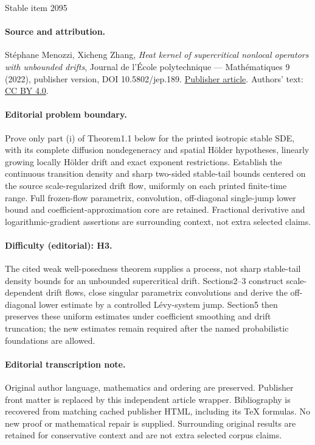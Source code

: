 \documentclass[11pt]{article}
\numberwithin{equation}{section}\providecommand{\asymp}{\mathrel{\sim}}
\theoremstyle{plain}
\theoremstyle{definition}
\newcommand\1{{\mathbf{1}}}
\begin{document}
\begin{center}{\Large Stable item 2095}\end{center}
\paragraph{Source and attribution.}
Stéphane Menozzi, Xicheng Zhang, \emph{Heat kernel of supercritical nonlocal operators with unbounded drifts}, Journal de l’École polytechnique — Mathématiques 9 (2022), publisher version, DOI 10.5802/jep.189. \href{https://jep.centre-mersenne.org/articles/10.5802/jep.189/}{Publisher article}. Authors' text: \href{https://creativecommons.org/licenses/by/4.0/}{CC BY 4.0}.
\paragraph{Editorial problem boundary.}
Prove only part (i) of Theorem1.1 below for the printed isotropic stable SDE, with its complete diffusion nondegeneracy and spatial Hölder hypotheses, linearly growing locally Hölder drift and exact exponent restrictions. Establish the continuous transition density and sharp two-sided stable-tail bounds centered on the source scale-regularized drift flow, uniformly on each printed finite-time range. Full frozen-flow parametrix, convolution, off-diagonal single-jump lower bound and coefficient-approximation core are retained. Fractional derivative and logarithmic-gradient assertions are surrounding context, not extra selected claims.
\paragraph{Difficulty (editorial): H3.}
The cited weak well-posedness theorem supplies a process, not sharp stable-tail density bounds for an unbounded supercritical drift. Sections2–3 construct scale-dependent drift flows, close singular parametrix convolutions and derive the off-diagonal lower estimate by a controlled Lévy-system jump. Section5 then preserves these uniform estimates under coefficient smoothing and drift truncation; the new estimates remain required after the named probabilistic foundations are allowed.
\paragraph{Editorial transcription note.}
Original author language, mathematics and ordering are preserved. Publisher front matter is replaced by this independent article wrapper. Bibliography is recovered from matching cached publisher HTML, including its TeX formulas. No new proof or mathematical repair is supplied. Surrounding original results are retained for conservative context and are not extra selected corpus claims.
\clearpage
\end{document}

